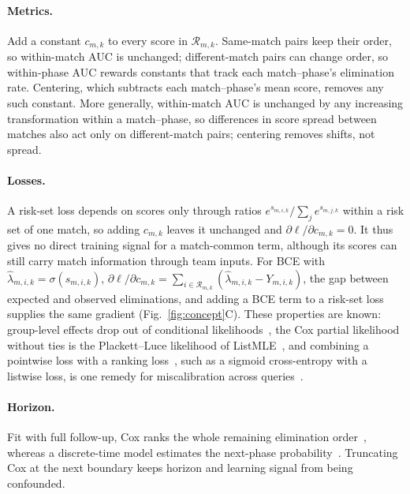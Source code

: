 \documentclass[sigconf,anonymous]{acmart}
\begin{document}
\paragraph{Metrics.}
Add a constant $c_{m,k}$ to every score in $\mathcal{R}_{m,k}$. Same-match pairs keep their order, so within-match AUC is unchanged; different-match pairs can change order, so within-phase AUC rewards constants that track each match--phase's elimination rate. Centering, which subtracts each match--phase's mean score, removes any such constant. More generally, within-match AUC is unchanged by any increasing transformation within a match--phase, so differences in score spread between matches also act only on different-match pairs; centering removes shifts, not spread.

\paragraph{Losses.}
A risk-set loss depends on scores only through ratios $e^{s_{m,i,k}}/\sum_{j}e^{s_{m,j,k}}$ within a risk set of one match, so adding $c_{m,k}$ leaves it unchanged and $\partial\ell/\partial c_{m,k}=0$. It thus gives no direct training signal for a match-common term, although its scores can still carry match information through team inputs. For BCE with $\hat\lambda_{m,i,k}=\sigma(s_{m,i,k})$, $\partial\ell/\partial c_{m,k}=\sum_{i\in\mathcal{R}_{m,k}}(\hat\lambda_{m,i,k}-Y_{m,i,k})$, the gap between expected and observed eliminations, and adding a BCE term to a risk-set loss supplies the same gradient (Fig.~\ref{fig:concept}C). These properties are known: group-level effects drop out of conditional likelihoods~\cite{Chamberlain80}, the Cox partial likelihood without ties is the Plackett--Luce likelihood of ListMLE~\cite{Xia08}, and combining a pointwise loss with a ranking loss~\cite{Sculley10}, such as a sigmoid cross-entropy with a listwise loss, is one remedy for miscalibration across queries~\cite{Bai23}.

\paragraph{Horizon.}
Fit with full follow-up, Cox ranks the whole remaining elimination order~\cite{Cox72}, whereas a discrete-time model estimates the next-phase probability~\cite{SingerWillett93,Gensheimer19}. Truncating Cox at the next boundary keeps horizon and learning signal from being confounded.
\end{document}
